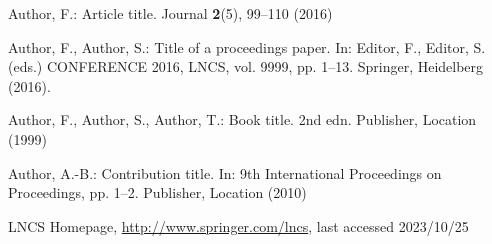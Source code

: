 \documentclass[runningheads]{llncs}
\begin{document}
%
%
% 
% 
%
\begin{thebibliography}{8}
Author, F.: Article title. Journal \textbf{2}(5), 99--110 (2016)

Author, F., Author, S.: Title of a proceedings paper. In: Editor,
F., Editor, S. (eds.) CONFERENCE 2016, LNCS, vol. 9999, pp. 1--13.
Springer, Heidelberg (2016). 

Author, F., Author, S., Author, T.: Book title. 2nd edn. Publisher,
Location (1999)

Author, A.-B.: Contribution title. In: 9th International Proceedings
on Proceedings, pp. 1--2. Publisher, Location (2010)

LNCS Homepage, \url{http://www.springer.com/lncs}, last accessed 2023/10/25
\end{thebibliography}
\end{document}
